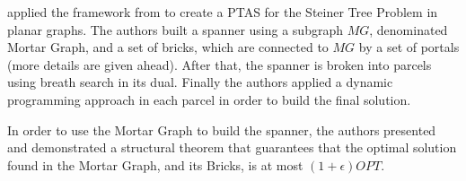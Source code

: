 
\cite{Borradaile2009b} applied the framework from \cite{KleinTSP} to create a PTAS for the Steiner Tree Problem in planar graphs. The authors built a spanner using a subgraph \(MG\), denominated Mortar Graph, and a set of bricks, which are connected to \(MG\) by a set of portals (more details are given ahead). After that, the spanner is broken into parcels using breath search in its dual. Finally the authors applied a dynamic programming approach in each parcel in order to build the final solution.


In order to use the Mortar Graph to build the spanner, the authors presented and demonstrated a structural theorem that guarantees that the optimal solution found in the Mortar Graph, and its Bricks, is at most \((1 + \epsilon) OPT\).


